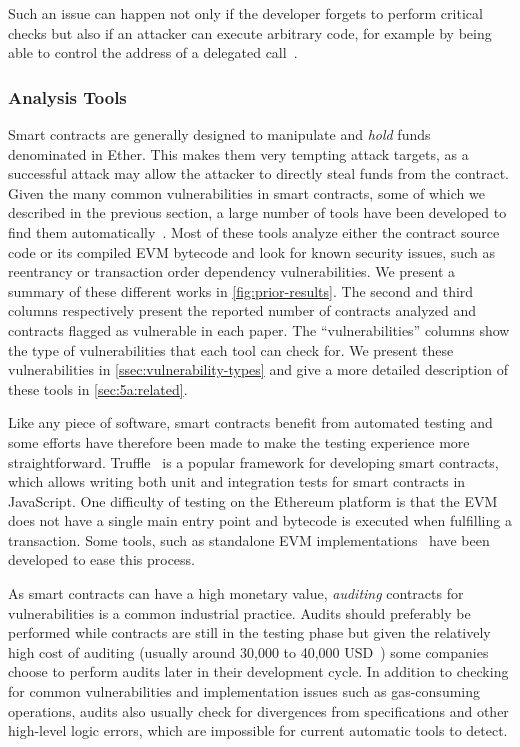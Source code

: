 Such an issue can happen not only if the developer forgets to perform critical checks but also if an attacker can execute arbitrary code, for example by being able to control the address of a delegated call~\cite{Krupp2018}.



\subsubsection{Analysis Tools}
\label{ssec:analysis-tools}
Smart contracts are generally designed to manipulate and \emph{hold} funds denominated in Ether. This makes them very tempting attack targets, as a successful attack may allow the attacker to directly steal funds from the contract.
Given the many common vulnerabilities in smart contracts, some of which we described in the previous section, a large number of tools have been developed to find them automatically~\cite{luu2016a,Tsankov2018,mythril}.
Most of these tools analyze either the contract source code or its compiled EVM bytecode and look for known security issues, such as reentrancy or transaction order dependency vulnerabilities. We present a summary of these different works in \autoref{fig:prior-results}. The second and third columns respectively present the reported number of contracts analyzed and contracts flagged as vulnerable in each paper. The ``vulnerabilities'' columns show the type of vulnerabilities that each tool can check for. We present these vulnerabilities in \autoref{ssec:vulnerability-types} and give a more detailed description of these tools in \autoref{sec:5a:related}.

Like any piece of software, smart contracts benefit from automated testing and some efforts have therefore been made to make the testing experience more straightforward. Truffle~\cite{truffle} is a popular framework for developing smart contracts, which allows writing both unit and integration tests for smart contracts in JavaScript. One difficulty of testing on the Ethereum platform is that the EVM does not have a single main entry point and bytecode is executed when fulfilling a transaction. Some tools, such as standalone EVM implementations~\cite{ganache} have been developed to ease this process.

As smart contracts can have a high monetary value, \emph{auditing} contracts for vulnerabilities is a common industrial practice.
Audits should preferably be performed while contracts are still in the testing phase but given the relatively high cost of auditing (usually around 30,000 to 40,000 USD~\cite{solidified}) some companies choose to perform audits later in their development cycle. In addition to checking for common vulnerabilities and implementation issues such as gas-consuming operations, audits also usually check for divergences from specifications and other high-level logic errors, which are impossible for current automatic tools to detect.

